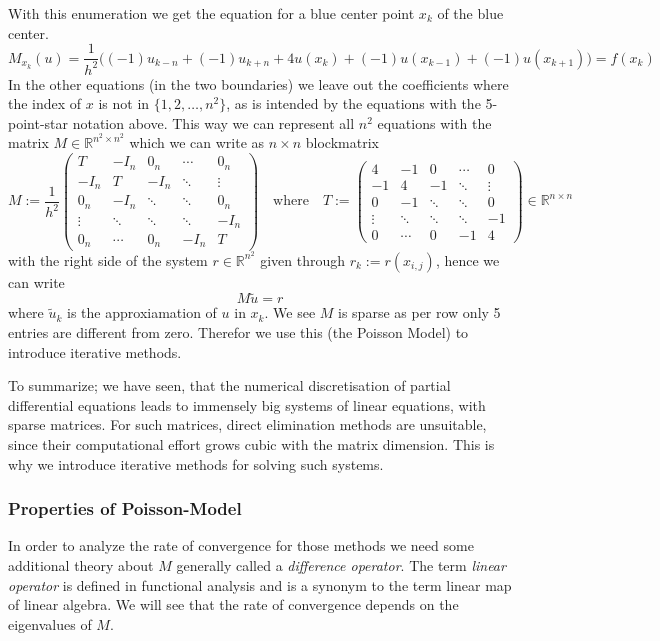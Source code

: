 With this enumeration we get the equation for a blue center point \(x_k\) of the blue center.
\[M_{x_k}(u) = \frac{1}{h^2}\big((-1)u_{k-n} + (-1)u_{k+n} + 4u(x_k) + (-1)u(x_{k-1}) + (-1)u(x_{k+1})\big) = f(x_k)\]
In the other equations (in the two boundaries) we leave out the coefficients where the index of \(x\) is not in \(\{1, 2, \ldots, n^2\}\), as is intended by the equations with the 5-point-star notation above.
This way we can represent all \(n^2\) equations with the matrix \(M \in \mathbb{R}^{n^2 \times n^2}\) which we can write as \(n \times n\) blockmatrix
\[M := \frac{1}{h^2} \begin{pmatrix}
      T & -I_n & 0_n & \cdots & 0_n\\
      -I_n & T & -I_n & \ddots & \vdots\\
      0_n & -I_n & \ddots & \ddots & 0_n\\
      \vdots & \ddots & \ddots & \ddots & -I_n\\
      0_n & \cdots & 0_n & -I_n & T
   \end{pmatrix} \quad\text{where}\quad T := \begin{pmatrix}
      4 & -1 & 0 & \cdots & 0\\
      -1 & 4 & -1 & \ddots & \vdots\\
      0 & -1 & \ddots & \ddots & 0\\
      \vdots & \ddots & \ddots & \ddots & -1\\
      0 & \cdots & 0 & -1 & 4
\end{pmatrix} \in \mathbb{R}^{n \times n}\]
with the right side of the system \(r \in \mathbb{R}^{n^2}\) given through \(r_k := r(x_{i,j})\), hence we can write
\[M\widetilde{u} = r\]
where \(\widetilde{u}_k\) is the approxiamation of \(u\) in \(x_k\).
We see \(M\) is sparse as per row only 5 entries are different from zero.
Therefor we use this (the Poisson Model) to introduce iterative methods.

To summarize; we have seen, that the numerical discretisation of partial differential equations leads to immensely big systems of linear equations, with sparse matrices.
For such matrices, direct elimination methods are unsuitable, since their computational effort grows cubic with the matrix dimension.
This is why we introduce iterative methods for solving such systems.

\subsubsection{Properties of Poisson-Model}
In order to analyze the rate of convergence for those methods we need some additional theory about \(M\) generally called a \emph{difference operator}.
The term \emph{linear operator} is defined in functional analysis and is a synonym to the term linear map of linear algebra.
We will see that the rate of convergence depends on the eigenvalues of \(M\).

